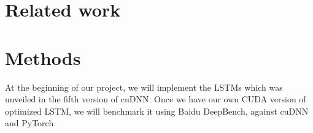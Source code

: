 \documentclass{article}
\begin{document}
\section{Related work}

\section{Methods}

At the beginning of our project, we will implement the LSTMs which was unveiled in the fifth version of cuDNN. Once we have our own CUDA version of optimized LSTM, we will benchmark it using Baidu DeepBench\cite{DeepBench}, against cuDNN and PyTorch\cite{PyTorch}.

\medskip


\end{document}
